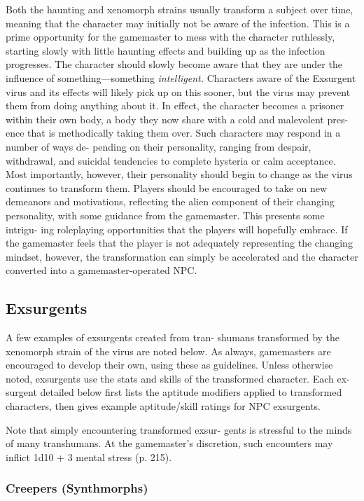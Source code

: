 Both the haunting and xenomorph strains usually 
transform a subject over time, meaning that the 
character may initially not be aware of the infection. 
This is a prime opportunity for the gamemaster to 
mess with the character ruthlessly, starting slowly 
with little haunting effects and building up as the 
infection progresses. The character should slowly 
become aware that they are under the influence of 
something—something \textit{intelligent.} Characters aware 
of the Exsurgent virus and its effects will likely pick 
up on this sooner, but the virus may prevent them 
from doing anything about it. In effect, the character 
becomes a prisoner within their own body, a body 
they now share with a cold and malevolent pres-
ence that is methodically taking them over. Such 
characters may respond in a number of ways de-
pending on their personality, ranging from despair, 
withdrawal, and suicidal tendencies to complete 
hysteria or calm acceptance. Most importantly, 
however, their personality should begin to change 
as the virus continues to transform them. Players 
should be encouraged to take on new demeanors 
and motivations, reflecting the alien component 
of their changing personality, with some guidance 
from the gamemaster. This presents some intrigu-
ing roleplaying opportunities that the players will 
hopefully embrace. If the gamemaster feels that the 
player is not adequately representing the changing 
mindset, however, the transformation can simply 
be accelerated and the character converted into a 
gamemaster-operated NPC. 

\subsection{Exsurgents }

A few examples of exsurgents created from tran-
shumans transformed by the xenomorph strain of 
the virus are noted below. As always, gamemasters 
are encouraged to develop their own, using these as 
guidelines. Unless otherwise noted, exsurgents use the 
stats and skills of the transformed character. Each ex-
surgent detailed below first lists the aptitude modifiers 
applied to transformed characters, then gives example 
aptitude/skill ratings for NPC exsurgents.

Note that simply encountering transformed exsur-
gents is stressful to the minds of many transhumans. 
At the gamemaster's discretion, such encounters may 
inflict 1d10 + 3 mental stress (p. 215).

\subsubsection{Creepers (Synthmorphs)}

